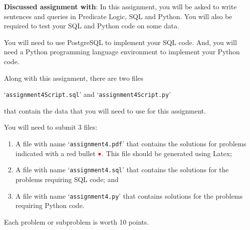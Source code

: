 \documentclass[12pt]{exam}
\newcommand{\red}[1]{{\color{red}#1}}
\newcommand{\redbullet}{\red{\bullet}}
\newcommand{\<}{\langle}
\renewcommand{\>}{\rangle}
\theoremstyle{definition}   %
\begin{document}
\pagestyle{headandfoot}



\vfill
\noindent
{\bf Discussed assignment with}:
\noindent
\vskip 3cm
In this assignment, you will be asked to write sentences and queries in Predicate Logic, SQL and
Python.   You will also be required to test your SQL and Python code on some data.

You will need to use PostgreSQL to implement your SQL code.
And, you will need a Python programming language environment to implement your Python code.

Along with this assignment, there are two files 
\begin{center}
`{\tt assignment4Script.sql}' and `{\tt assignment4Script.py}'
\end{center}
that contain
the data that you will need to use for this assignment.

You will need to submit 3 files:
\begin{enumerate}
\item A file with name `{\tt assignment4.pdf}' 
that contains the solutions for problems indicated with a red bullet $\redbullet$.
This file should be generated using Latex;
\item A file with name `{\tt assignment4.sql}' that contains
the solutions for the problems requiring SQL code; and 
\item A file with name `{\tt assignment4.py}' that contains
solutions for the problems requiring Python code.
\end{enumerate}

\bigskip
Each problem or subproblem is worth 10 points.
\end{document}
